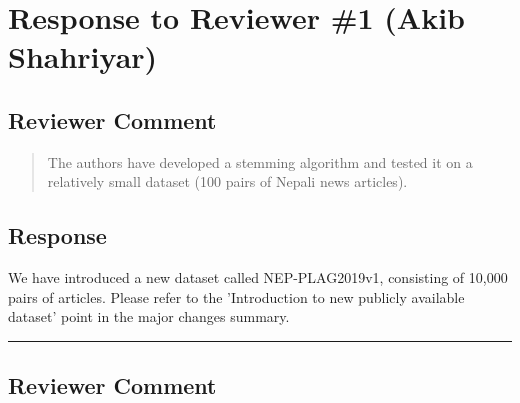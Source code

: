 \section{Response to Reviewer \#1 (Akib Shahriyar)}




\subsection{Reviewer Comment}
\begin{mdframed}
\begin{quote}
The authors have developed a stemming algorithm and tested it on a relatively small dataset (100 pairs of Nepali news articles).
\end{quote}
\end{mdframed}

\subsection{Response} 
We have introduced a new dataset called NEP-PLAG2019v1, consisting of 10,000
pairs of articles. Please refer to the 'Introduction to new publicly available dataset'
point in the major changes summary.\\

\noindent\rule{17cm}{2.0pt}

\subsection{Reviewer Comment}

